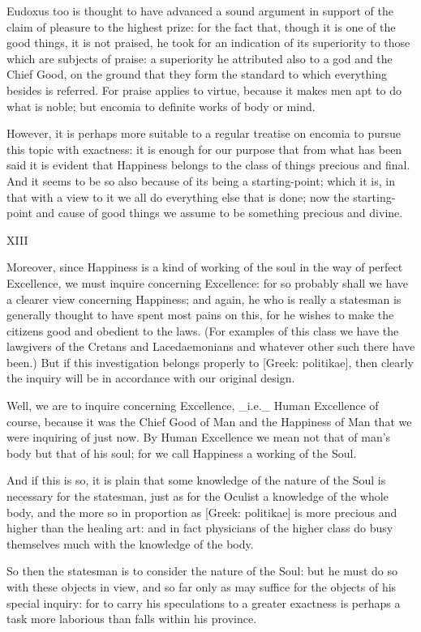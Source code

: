 Eudoxus too is thought to have advanced a sound argument in support of
the claim of pleasure to the highest prize: for the fact that, though it
is one of the good things, it is not praised, he took for an indication
of its superiority to those which are subjects of praise: a superiority
he attributed also to a god and the Chief Good, on the ground that they
form the standard to which everything besides is referred. For praise
applies to virtue, because it makes men apt to do what is noble; but
encomia to definite works of body or mind.

However, it is perhaps more suitable to a regular treatise on encomia to
pursue this topic with exactness: it is enough for our purpose that from
what has been said it is evident that Happiness belongs to the class of
things precious and final. And it seems to be so also because of its
being a starting-point; which it is, in that with a view to it we all do
everything else that is done; now the starting-point and cause of good
things we assume to be something precious and divine.


XIII

Moreover, since Happiness is a kind of working of the soul in the way
of perfect Excellence, we must inquire concerning Excellence: for so
probably shall we have a clearer view concerning Happiness; and again,
he who is really a statesman is generally thought to have spent most
pains on this, for he wishes to make the citizens good and obedient
to the laws. (For examples of this class we have the lawgivers of the
Cretans and Lacedaemonians and whatever other such there have been.)
But if this investigation belongs properly to [Greek: politikae], then
clearly the inquiry will be in accordance with our original design.

Well, we are to inquire concerning Excellence, _i.e._ Human Excellence
of course, because it was the Chief Good of Man and the Happiness of Man
that we were inquiring of just now. By Human Excellence we mean not that
of man's body but that of his soul; for we call Happiness a working of
the Soul.

And if this is so, it is plain that some knowledge of the nature of the
Soul is necessary for the statesman, just as for the Oculist a knowledge
of the whole body, and the more so in proportion as [Greek: politikae]
is more precious and higher than the healing art: and in fact physicians
of the higher class do busy themselves much with the knowledge of the
body.

So then the statesman is to consider the nature of the Soul: but he must
do so with these objects in view, and so far only as may suffice for
the objects of his special inquiry: for to carry his speculations to a
greater exactness is perhaps a task more laborious than falls within his
province.

